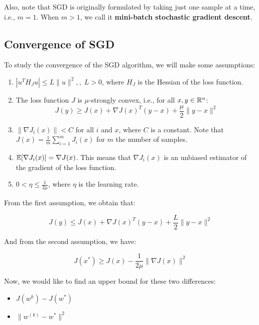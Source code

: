 Also, note that SGD is originally formulated by taking just one sample at a time, i.e., $m = 1$.
When $m > 1$, we call it \textbf{mini-batch stochastic gradient descent}.

\subsection{Convergence of SGD}

To study the convergence of the SGD algorithm, we will make some assumptions:

\begin{enumerate}
    \item $|u^T H_J u| \leq L \|u\|^2, ,\; L > 0$, where $H_J$ is the Hessian of the loss function.
    
    \item The loss function $J$ is $\mu$-strongly convex, i.e., for all $x, y \in \mathbb{R}^n$:
    $$J(y) \geq J(x) + \nabla J(x)^T (y - x) + \frac{\mu}{2} \|y - x\|^2$$

    \item $\|\nabla J_i(x)\| < C$ for all $i$ and $x$, where $C$ is a constant. Note 
    that $J(x) = \frac{1}{m} \sum_{i=1}^m J_i(x)$ for $m$ the number of samples.

    \item $\mathbb{E}[\nabla J_i(x)] = \nabla J(x)$. This means that $\nabla J_i(x)$ is an unbiased
    estimator of the gradient of the loss function.

    \item $0 < \eta \leq \frac{1}{2\mu}$, where $\eta$ is the learning rate.
\end{enumerate}

From the first assumption, we obtain that:

\begin{equation}
    J(y) \leq J(x) + \nabla J(x)^T (y - x) + \frac{L}{2} \|y - x\|^2
\end{equation}

And from the second assumption, we have:

\begin{equation}
    J(x^*) \geq J(x) - \frac{1}{2 \mu} \| \nabla J(x) \|^2
\end{equation}

Now, we would like to find an upper bound for these two differences:

\begin{itemize}
    \item $J(w^{k}) - J(w^*)$
    \item $\|w^{(k)} - w^*\|^2$
\end{itemize}

